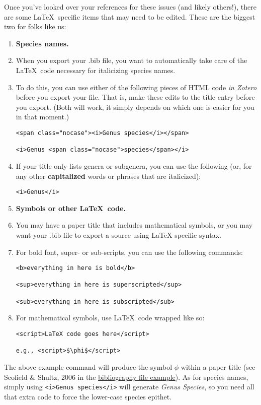 \documentclass[11pt]{article}
\begin{document}
Once you've looked over your references for these issues (and likely others!), there are some \LaTeX\ specific items that may need to be edited. These are the biggest two for folks like us:

\begin{enumerate}
\item[]{\textbf{Species names.}}
\item[]{When you export your .bib file, you want to automatically take care of the \LaTeX\ code necessary for italicizing species names.} 
\item{To do this, you can use either of the following pieces of HTML code \textit{in Zotero} before you export your file. That is, make these edits to the title entry before you export. (Both will work, it simply depends on which one is easier for you in that moment.)
\begin{verbatim}
<span class="nocase"><i>Genus species</i></span>

<i>Genus <span class="nocase">species</span></i>
\end{verbatim}
}
\item{If your title only lists genera or subgenera, you can use the following (or, for any other \textbf{capitalized} words or phrases that are italicized):
\begin{verbatim}
<i>Genus</i>
\end{verbatim}
}
\pagebreak
\item[]{\textbf{Symbols or other \LaTeX\ code.}}
\item[]{You may have a paper title that includes mathematical symbols, or you may want your .bib file to export a source using \LaTeX-specific syntax.}
\item{For bold font, super- or sub-scripts, you can use the following commands:
\begin{verbatim}
<b>everything in here is bold</b>

<sup>everything in here is superscripted</sup>

<sub>everything in here is subscripted</sub>
\end{verbatim}
}
\item{For mathematical symbols, use \LaTeX\ code wrapped like so:
\begin{verbatim}
<script>LaTeX code goes here</script>

e.g., <script>$\phi$</script>
\end{verbatim}
}
\end{enumerate}

The above example command will produce the symbol $\phi$ within a paper title (see Scofield \& Shultz, 2006 in the \href{https://github.com/ledelaney/BibTeXforBrownLab/blob/master/ExampleFiles/RefsOnlyBib/MyImportantBibliography.pdf}{bibliography file example}). As for species names, simply using \verb|<i>Genus species</i>| will generate \textit{Genus Species}, so you need all that extra code to force the  lower-case species epithet.
\end{document}
